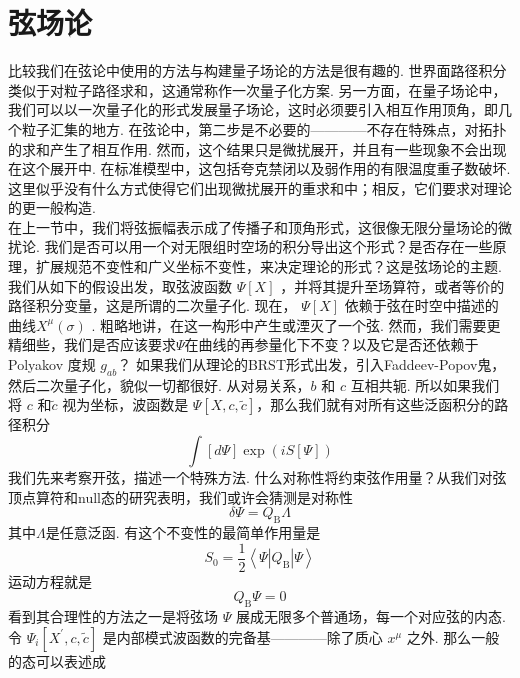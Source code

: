 \section{弦场论}%
比较我们在弦论中使用的方法与构建量子场论的方法是很有趣的. 世界面路径积分类似于对粒子路径求和，这通常称作一次量子化方案. 另一方面，在量子场论中，我们可以以一次量子化的形式发展量子场论，这时必须要引入相互作用顶角，即几个粒子汇集的地方. 在弦论中，第二步是不必要的————不存在特殊点，对拓扑的求和产生了相互作用. 然而，这个结果只是微扰展开，并且有一些现象不会出现在这个展开中. 在标准模型中，这包括夸克禁闭以及弱作用的有限温度重子数破坏. 这里似乎没有什么方式使得它们出现微扰展开的重求和中；相反，它们要求对理论的更一般构造.\\
在上一节中，我们将弦振幅表示成了传播子和顶角形式，这很像无限分量场论的微扰论. 我们是否可以用一个对无限组时空场的积分导出这个形式？是否存在一些原理，扩展规范不变性和广义坐标不变性，来决定理论的形式？这是弦场论的主题.\\
我们从如下的假设出发，取弦波函数 $\Psi[X]$ ，并将其提升至场算符，或者等价的路径积分变量，这是所谓的二次量子化. 现在， $\Psi[X]$ 依赖于弦在时空中描述的曲线$X^{\mu}(\sigma)$ . 粗略地讲，在这一构形中产生或湮灭了一个弦. 然而，我们需要更精细些，我们是否应该要求$\Psi$在曲线的再参量化下不变？以及它是否还依赖于 Polyakov 度规 $g_{a b} $？ 如果我们从理论的BRST形式出发，引入Faddeev-Popov鬼，然后二次量子化，貌似一切都很好. 从对易关系，$b$ 和 $c$ 互相共轭. 所以如果我们将 $c$ 和$\tilde{c}$ 视为坐标，波函数是 $\Psi[X, c, \tilde{c}] $，那么我们就有对所有这些泛函积分的路径积分
\begin{equation}
	\int[d \Psi] \exp (i S[\Psi])
\end{equation}
我们先来考察开弦，描述一个特殊方法. 什么对称性将约束弦作用量？从我们对弦顶点算符和null态的研究表明，我们或许会猜测是对称性
\begin{equation}
	\delta \Psi=Q_{\mathrm{B}} \Lambda
\end{equation}
其中$\Lambda$是任意泛函. 有这个不变性的最简单作用量是
\begin{equation}
	S_{0}=\frac{1}{2}\left\langle\Psi\left|Q_{\mathrm{B}}\right| \Psi\right\rangle
\end{equation}
运动方程就是
\begin{equation}
	Q_{\mathrm{B}} \Psi=0
\end{equation}
看到其合理性的方法之一是将弦场 $\Psi$ 展成无限多个普通场，每一个对应弦的内态. 令 $\Psi_{i}\left[X^{\prime}, c, \tilde{c}\right]$ 是内部模式波函数的完备基————除了质心 $x^{\mu} $ 之外. 那么一般的态可以表述成
